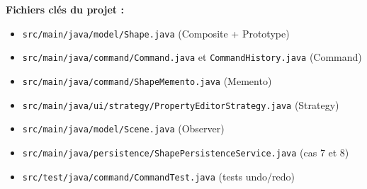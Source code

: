 \documentclass[11pt,a4paper,french]{article}
\begin{document}
\vspace{1cm}

\noindent\textbf{Fichiers clés du projet :}

\begin{itemize}
  \item \texttt{src/main/java/model/Shape.java} (Composite + Prototype)
  \item \texttt{src/main/java/command/Command.java} et \texttt{CommandHistory.java} (Command)
  \item \texttt{src/main/java/command/ShapeMemento.java} (Memento)
  \item \texttt{src/main/java/ui/strategy/PropertyEditorStrategy.java} (Strategy)
  \item \texttt{src/main/java/model/Scene.java} (Observer)
  \item \texttt{src/main/java/persistence/ShapePersistenceService.java} (cas 7 et 8)
  \item \texttt{src/test/java/command/CommandTest.java} (tests undo/redo)
\end{itemize}
\end{document}
